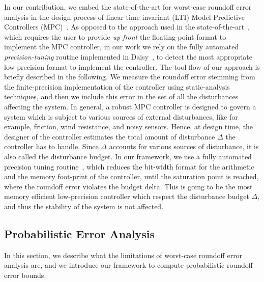 In our contribution, we embed the state-of-the-art for worst-case roundoff error analysis in the design process of linear time invariant (LTI) Model Predictive Controllers (MPC)~\cite{mpc}.
%
As opposed to the approach used in the state-of-the-art~\cite{suardi}, which requires the user to provide \emph{up front} the floating-point format to implement the MPC controller, in our work we rely on the fully automated \emph{precision-tuning} routine implemented in Daisy~\cite{darulova2018daisy}, to detect the most appropriate low-precision format to implement the controller.
%
The tool flow of our approach is briefly described in the following. We measure the roundoff error stemming from the finite-precision implementation of the controller using static-analysis techniques, and then we include this error in the set of all the disturbances affecting the system.
%
In general, a robust MPC controller is designed to govern a system which is subject to various sources of external disturbances, like for example, friction, wind resistance, and noisy sensors.
%
Hence, at design time, the designer of the controller estimates the total amount of disturbance $\Delta$ the controller has to handle.
%
Since $\Delta$ accounts for various sources of disturbance, it is also called the \textquotesingle\textquotesingle disturbance budget\textquotesingle\textquotesingle.
%
%
In our framework, we use a fully automated precision tuning routine~\cite{fptuner}, which reduces the bit-width format for the arithmetic and the memory foot-print of the controller, until the saturation point is reached, where the roundoff error violates the budget delta.
%
This is going to be the most memory efficient low-precision controller which respect the disturbance budget $\Delta$, and thus the stability of the system is not affected.
%

%
%  
%  
%
%
%
%
\subsection{Probabilistic Error Analysis}
\label{sec:prob}
%
In this section, we describe what the limitations of worst-case roundoff error analysis are, and we introduce our framework to compute probabilistic roundoff error bounds.
%

